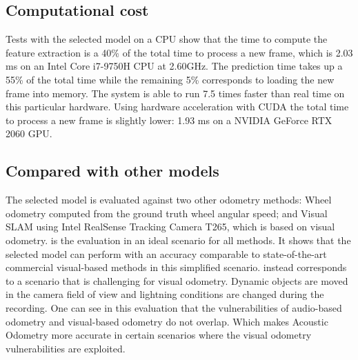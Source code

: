 \begin{figure*}
    \centering
\end{figure*}

\subsection{Computational cost} Tests with the selected model on a CPU show
that the time to compute the feature extraction is a 40\% of the total time to
process a new frame, which is 2.03 ms on an Intel\textregistered{}
Core\texttrademark{} i7-9750H CPU at 2.60GHz. The prediction time takes up a
55\% of the total time while the remaining 5\% corresponds to loading the new
frame into memory. The system is able to run 7.5 times faster than real time on
this particular hardware. Using hardware acceleration with CUDA the total time
to process a new frame is slightly lower: 1.93 ms on a NVIDIA GeForce RTX 2060
GPU.

\subsection{Compared with other models} The selected model is evaluated against
two other odometry methods: Wheel odometry computed from the ground truth wheel
angular speed; and Visual SLAM using Intel\textregistered{}
RealSense\texttrademark{} Tracking Camera T265, which is based on visual
odometry.  is the evaluation in an ideal scenario for
all methods. It shows that the selected model can perform with an accuracy
comparable to state-of-the-art commercial visual-based methods in this
simplified scenario.  instead corresponds to a scenario
that is challenging for visual odometry. Dynamic objects are moved in the
camera field of view and lightning conditions are changed during the recording.
One can see in this evaluation that the vulnerabilities of audio-based odometry
and visual-based odometry do not overlap. Which makes Acoustic Odometry more
accurate in certain scenarios where the visual odometry vulnerabilities are
exploited.

